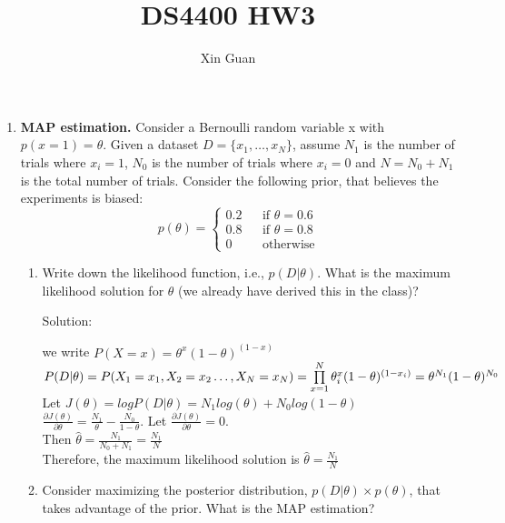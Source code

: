 \documentclass[12pt]{article}
\title{DS4400 HW3}
\author{Xin Guan}
\date{}
\newcommand{\solu}{{\color{blue} Solution:}}
\begin{document}
    \maketitle
    \begin{enumerate}
        \item \textbf{MAP estimation.} Consider a Bernoulli random variable x with $p(x = 1) = \theta$. Given a dataset $D = \{x_1, \dots ,x_N\}$, assume $N_1$ is the number of trials where $x_i = 1$, $N_0$ is the number of trials where $x_i = 0$ and $N = N_0 + N_1$ is the total number of trials. Consider the following prior, that believes the experiments is biased:
        $$p(\theta) = \left\{
            \begin{array}{rcl}
            0.2  & & \text{if }\theta = 0.6 \\
            0.8 & & \text{if }\theta = 0.8 \\
            0 & & \text{otherwise}
        \end{array}
        \right.$$
        \begin{enumerate}
            \item Write down the likelihood function, i.e., $p(D|\theta)$. What is the maximum likelihood solution for $\theta$ (we already have derived this in the class)?
            
            \solu
            
            we write $P(X = x) = \theta^x(1-\theta)^{(1-x)}$\\
            $P(D | \theta) = P(X_1 = x_1, X_2 = x_2 \dots, X_N= x_N)\\
            = \prod\limits_{x = 1}^{N}\theta^x_i(1-\theta)^{(1-x_i)}\\
            = \theta^{N_1}(1-\theta)^{N_0}$\\
            Let $J(\theta) = logP(D | \theta) = N_1log(\theta) + N_0log(1 - \theta)$\\
            $\frac{\partial J(\theta)}{\partial \theta} = \frac{N_1}{\theta} - \frac{N_0}{1 - \theta}$.
            Let $\frac{\partial J(\theta)}{\partial \theta} = 0$.\\
            Then $\hat{\theta} = \frac{N_1}{N_0 + N_1} = \frac{N_1}{N}$\\
            Therefore, the maximum likelihood solution is $\hat{\theta} = \frac{N_1}{N}$

            \item Consider maximizing the posterior distribution, $p(D|\theta) \times p(\theta)$, that takes advantage of the prior. What is the MAP estimation?
            

\end{enumerate}
\end{enumerate}
\end{document}

